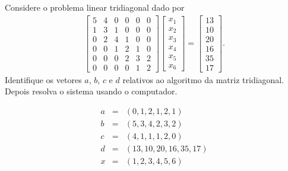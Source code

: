 \begin{exer} Considere o problema linear tridiagonal dado por
\begin{eqnarray} \begin{bmatrix}
   { 5  } & { 4 } & { 0 } & { 0 } & { 0 } & { 0 } \\
   { 1  } & { 3 } & { 1 } & { 0 } & { 0 } & { 0 } \\
   { 0  } & { 2 } & { 4 } & { 1 } & { 0 } & { 0 } \\
   { 0  } & { 0 } & { 1 } & { 2 } & { 1 } & { 0 } \\
   { 0  } & { 0 } & { 0 } & { 2 } & { 3 } & { 2 } \\
   { 0  } & { 0 } & { 0 } & { 0 } & { 1 } & { 2 }
    \end{bmatrix}
\begin{bmatrix}
   {x_1 }  \\
   {x_2 }  \\
   {x_3 }  \\
   {x_4 }  \\
   {x_5 }  \\
   {x_6}
\end{bmatrix}
=
\begin{bmatrix}
   {13}  \\
   {10 }  \\
   {20}  \\
   {16}\\
   {35}\\
   {17}
\end{bmatrix}
.
\end{eqnarray}
 Identifique os vetores $a$, $b$, $c$ e $d$  relativos ao algoritmo da matriz tridiagonal. Depois resolva o sistema usando o computador.
\end{exer}

\begin{resp}
 \begin{eqnarray}
  a &=& (0, 1, 2, 1, 2, 1)\\
  b &=& (5, 3, 4, 2, 3, 2)\\
  c &=& (4, 1, 1, 1, 2, 0)\\
  d &=& (13, 10, 20, 16, 35, 17)\\
  x &=& (1, 2, 3, 4, 5, 6)
 \end{eqnarray}
\end{resp}

